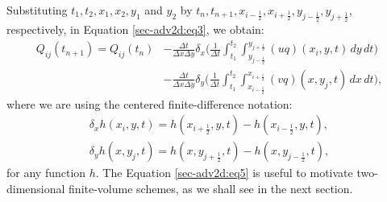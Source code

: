 Substituting $t_1, t_2, x_1, x_2, y_1$ and $y_2$ by 
$t_{n}, t_{n+1}, x_{i-\frac{1}{2}}, x_{i+\frac{1}{2}}, y_{j-\frac{1}{2}}, y_{j+\frac{1}{2}}$,
respectively, in Equation \eqref{sec-adv2d:eq3}, we obtain:
\begin{align}
	\label{sec-adv2d:eq5}
	{Q}_{ij}(t_{n+1})  = {Q}_{ij}(t_{n})
	&- \frac{\Delta t}{\Delta x \Delta y}
	\delta _x \bigg( \frac{1}{\Delta t}
	\int_{t_1}^{t_2} \int_{y_{j-\frac{1}{2}}}^{y_{j+\frac{1}{2}}} 
	{(uq)}(x_{i}, y, t)
	\,dy \,dt \bigg) \\ \nonumber
	&- \frac{\Delta t}{\Delta x \Delta y}
	\delta _y \bigg( \frac{1}{\Delta t}
	\int_{t_1}^{t_2} \int_{x_{i-\frac{1}{2}}}^{x_{i+\frac{1}{2}}} 
	{(vq)}(x, y_{j}, t)
	\,dx \,dt \bigg),
\end{align}
where we are using the centered finite-difference notation:
\begin{align}
	\label{sec-adv2d:eq6}
	\delta_x {h}(x_i,y, t) = 
	{h}(x_{i+\frac{1}{2}}, y, t) - 
	{h}(x_{i-\frac{1}{2}}, y, t), \\
	\delta_y {h}(x, y_j,t) = 
    {h}(x, y_{j+\frac{1}{2}},t) - 
    {h}(x, y_{j-\frac{1}{2}},t),
\end{align}
for any function ${h}$. The Equation \eqref{sec-adv2d:eq5} is useful to
motivate two-dimensional finite-volume schemes, as we shall see in the next section.

